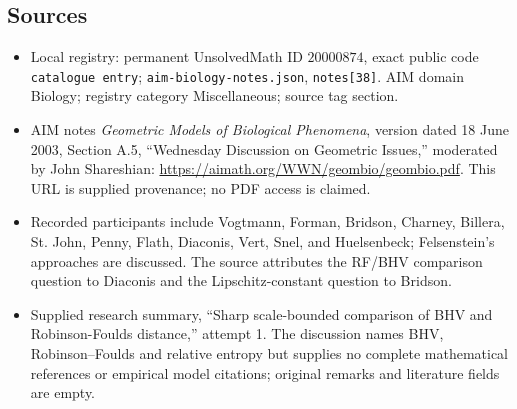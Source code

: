 \documentclass[11pt]{article}
\begin{document}
\subsection{Sources}
\begin{itemize}
\item Local registry: permanent UnsolvedMath ID \(20000874\), exact public code \texttt{catalogue entry}; \texttt{aim-biology-notes.json}, \texttt{notes[38]}. AIM domain Biology; registry category Miscellaneous; source tag section.
\item AIM notes \emph{Geometric Models of Biological Phenomena}, version dated 18 June 2003, Section A.5, ``Wednesday Discussion on Geometric Issues,'' moderated by John Shareshian: \url{https://aimath.org/WWN/geombio/geombio.pdf}. This URL is supplied provenance; no PDF access is claimed.
\item Recorded participants include Vogtmann, Forman, Bridson, Charney, Billera, St. John, Penny, Flath, Diaconis, Vert, Snel, and Huelsenbeck; Felsenstein's approaches are discussed. The source attributes the RF/BHV comparison question to Diaconis and the Lipschitz-constant question to Bridson.
\item Supplied research summary, ``Sharp scale-bounded comparison of BHV and Robinson-Foulds distance,'' attempt 1. The discussion names BHV, Robinson--Foulds and relative entropy but supplies no complete mathematical references or empirical model citations; original remarks and literature fields are empty.
\end{itemize}
\end{document}
